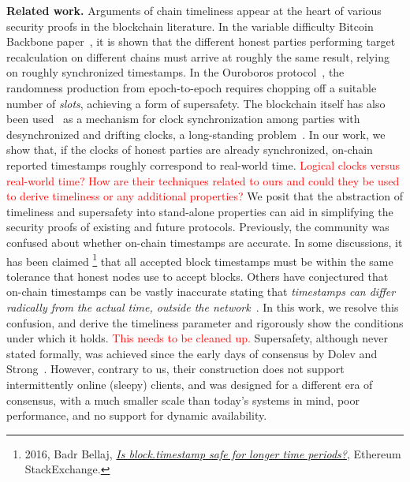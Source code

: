 \noindent
\textbf{Related work.}
Arguments of chain timeliness appear at the heart of various security proofs
in the blockchain literature.
In the variable difficulty Bitcoin Backbone paper~\cite{varbackbone},
it is shown that the different honest parties performing target recalculation on different chains
must arrive at roughly the same result, relying on roughly synchronized timestamps.
In the Ouroboros protocol~\cite{ouroboros},
the randomness production from epoch-to-epoch requires chopping off a suitable number of \emph{slots},
achieving a form of supersafety. The blockchain itself has also been used~\cite{klepsydra,chronos}
as a mechanism for clock synchronization among parties with desynchronized and drifting clocks,
a long-standing problem~\cite{lamport-synchronizing-clocks}.
In our work, we show that, if the clocks of honest parties are already synchronized,
on-chain reported timestamps roughly correspond to real-world time.
\textcolor{red}{Logical clocks versus real-world time? How are their techniques related to ours and could they be used to derive timeliness or any additional properties?}
We posit that the abstraction of timeliness and supersafety
into stand-alone properties can aid in simplifying the security proofs
of existing and future protocols.
Previously, the community was confused about whether on-chain timestamps are accurate.
In some discussions, it has been
claimed \footnote{2016, Badr Bellaj, \href{https://ethereum.stackexchange.com/a/9752}{\emph{Is block.timestamp safe for longer time periods?}}, Ethereum StackExchange.} that all accepted block timestamps must be within the same tolerance that honest nodes use to accept blocks.
Others have conjectured that on-chain timestamps can be vastly
inaccurate stating that \emph{timestamps can differ radically from the
actual time, outside the network}~\cite{szalachowski2018short}.
In this work, we resolve this confusion, and derive the timeliness parameter and rigorously show the conditions under which it holds.
\textcolor{red}{This needs to be cleaned up.}
Supersafety, although never stated formally, was achieved since the early
days of consensus by Dolev and Strong~\cite{dolev-strong}.
However, contrary to us, their construction does not support intermittently online (sleepy) clients,
and was designed for a different era of consensus, with a much smaller scale
than today's systems in mind, poor performance, and no support for dynamic availability.
